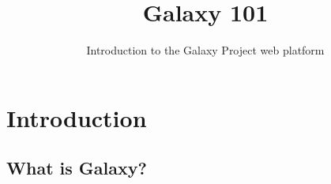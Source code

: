 \documentclass{beamer}              %
\title[Galaxy 101]{Galaxy 101}
\subtitle{Introduction to the Galaxy Project web platform}
\begin{document}
\begin{frame}
	\titlepage %
\end{frame}


\section{Introduction}

\subsection{What is Galaxy?}
\end{document}
